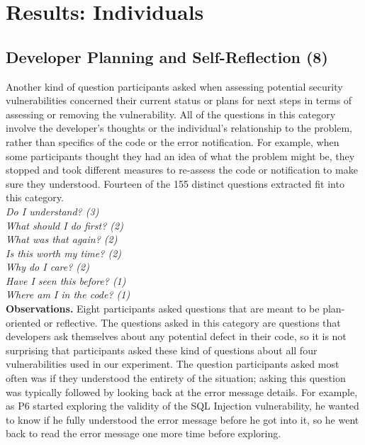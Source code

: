 \documentclass[conference]{IEEEtran}
\begin{document}


\section{Results: Individuals}
\label{sec:results-i}



\noindent\subsection{\textbf{Developer Planning and Self-Reflection (8)}} \label{dpr}

Another kind of question participants asked when assessing potential security vulnerabilities concerned their current status or plans for next steps in terms of assessing or removing the vulnerability. 
All of the questions in this category involve the developer's thoughts or the individual's relationship to the problem, rather than specifics of the code or the error notification.
For example, when some participants thought they had an idea of what the problem might be, they stopped and took different measures to re-assess the code or notification to make sure they understood.
Fourteen of the 155 distinct questions extracted fit into this category. 
\\

\noindent\emph{Do I understand? (3)} \\
\emph{What should I do first? (2)} \\
\emph{What was that again? (2)} \\
\emph{Is this worth my time? (2)} \\
\emph{Why do I care? (2)} \\
\emph{Have I seen this before? (1)} \\
\emph{Where am I in the code? (1)} \\



\noindent\textbf{Observations.}
Eight participants asked questions that are meant to be plan-oriented or reflective.
The questions asked in this category are questions that developers ask themselves about any potential defect in their code, so it is not surprising that participants asked these kind of questions about all four vulnerabilities used in our experiment.
The question participants asked most often was if they understood the entirety of the situation; asking this question was typically followed by looking back at the error message details. 
For example, as P6 started exploring the validity of the SQL Injection vulnerability, he wanted to know if he fully understood the error message before he got into it, so he went back to read the error message one more time before exploring.
\\
\end{document}
